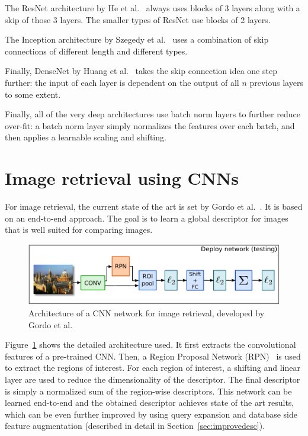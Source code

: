The ResNet architecture by He et al.~\cite{he_deep_2015} always uses blocks
of 3 layers along with a skip of those 3 layers. The smaller types of
ResNet use blocks of 2 layers.

The Inception architecture by Szegedy et al.~\cite{szegedy_inception-v4_2016}
uses a combination of skip connections of different length and different
types.

Finally, DenseNet by Huang et al.~\cite{huang_densely_2016} takes the
skip connection idea one step further:
the input of each layer is dependent on the output of all $n$ previous layers
to some extent.

Finally, all of the very deep architectures use batch norm layers to further
reduce over-fit: a batch norm layer simply normalizes the features over each
batch, and then applies a learnable scaling and shifting.

\section{Image retrieval using CNNs}
For image retrieval, the current state of the art is set by
Gordo et al.~\cite{gordo_deep_2016}. It is based on an
end-to-end approach. The goal is to learn a global descriptor for images
that is well suited for comparing images.

\begin{figure}
\includegraphics[width=\textwidth]{img/gordo_deepimageretrievaldeploy.png}
\caption{Architecture of a CNN network for image retrieval, developed by
Gordo et al.~\cite{gordo_deep_2016}
\label{fig:gordo_deploy}}
\end{figure}
Figure~\ref{fig:gordo_deploy} shows the detailed architecture used.
It first extracts the convolutional features of a pre-trained
CNN. Then, a Region Proposal Network (RPN)~\cite{ren_faster_2015} is
used to extract the regions of interest. For each region of interest,
a shifting and linear layer are used to reduce the dimensionality of
the descriptor. The final descriptor is simply a normalized sum of the
region-wise descriptors. This network can be learned end-to-end and
the obtained descriptor achieves state of the art results, which can
be even further improved by using query expansion and database side
feature augmentation (described in detail in Section~\ref{sec:improvedesc}).

